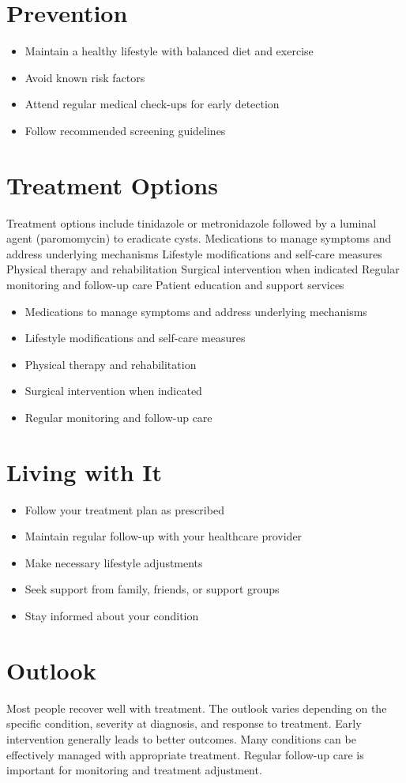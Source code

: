 \section{Prevention}
\begin{itemize}[noitemsep]
  \item Maintain a healthy lifestyle with balanced diet and exercise
  \item Avoid known risk factors
  \item Attend regular medical check-ups for early detection
  \item Follow recommended screening guidelines
\end{itemize}
\section{Treatment Options}
Treatment options include tinidazole or metronidazole followed by a luminal agent (paromomycin) to eradicate cysts. Medications to manage symptoms and address underlying mechanisms Lifestyle modifications and self-care measures Physical therapy and rehabilitation Surgical intervention when indicated Regular monitoring and follow-up care Patient education and support services

\begin{itemize}[noitemsep]
  \item Medications to manage symptoms and address underlying mechanisms
  \item Lifestyle modifications and self-care measures
  \item Physical therapy and rehabilitation
  \item Surgical intervention when indicated
  \item Regular monitoring and follow-up care
\end{itemize}
\section{Living with It}
\begin{itemize}[noitemsep]
  \item Follow your treatment plan as prescribed
  \item Maintain regular follow-up with your healthcare provider
  \item Make necessary lifestyle adjustments
  \item Seek support from family, friends, or support groups
  \item Stay informed about your condition
\end{itemize}
\section{Outlook}
Most people recover well with treatment. The outlook varies depending on the specific condition, severity at diagnosis, and response to treatment. Early intervention generally leads to better outcomes. Many conditions can be effectively managed with appropriate treatment. Regular follow-up care is important for monitoring and treatment adjustment.

